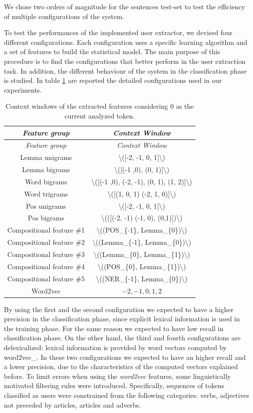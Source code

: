 \documentclass[]{book}
\theoremstyle{definition}
\theoremstyle{definition}
\theoremstyle{definition}
\theoremstyle{remark}
\begin{document}
We chose two orders of magnitude for the sentences test-set to test the
efficiency of multiple configurations of the system.

To test the performances of the implemented user extractor, we devised
four different configurations. Each configuration uses a specific
learning algorithm and a set of features to build the statistical model.
The main purpose of this procedure is to find the configurations that
better perform in the user extraction task. In addition, the different
behaviour of the system in the classification phase is studied. In table
\ref{tab:feat-confs} are reported the detailed configurations used in
our experiments.

\begin{longtable}[]{@{}cc@{}}
\caption{\label{tab:feat-confs} Context windows of the extracted features
considering 0 as the current analyzed token.}\tabularnewline
\toprule
\emph{Feature group} & \emph{Context Window}\tabularnewline
\midrule
\endfirsthead
\toprule
\emph{Feature group} & \emph{Context Window}\tabularnewline
\midrule
\endhead
Lemma unigrams & \textbackslash{}({[}-2, -1, 0,
1{]}\textbackslash{})\tabularnewline
Lemma bigrams & \textbackslash{}({[}(-1 ,0), (0,
1){]}\textbackslash{})\tabularnewline
Word bigrams & \textbackslash{}({[}(-1 ,0), (-2, -1), (0, 1), (1,
2){]}\textbackslash{})\tabularnewline
Word trigrams & \textbackslash{}({[}(1, 0, 1) (-2, 1,
0){]}\textbackslash{})\tabularnewline
Pos unigrams & \textbackslash{}({[}-2, -1, 0,
1{]}\textbackslash{})\tabularnewline
Pos bigrams & \textbackslash{}(({[}(-2, -1) (-1, 0),
(0,1){]})\textbackslash{})\tabularnewline
Compositional feature \#1 & \textbackslash{}((POS\_\{-1\},
Lemma\_\{0\})\textbackslash{})\tabularnewline
Compositional feature \#2 & \textbackslash{}((Lemma\_\{-1\},
Lemma\_\{0\})\textbackslash{})\tabularnewline
Compositional feature \#3 & \textbackslash{}((Lemma\_\{0\},
Lemma\_\{1\})\textbackslash{})\tabularnewline
Compositional feature \#4 & \textbackslash{}((POS\_\{0\},
Lemma\_\{1\})\textbackslash{})\tabularnewline
Compositional feature \#5 & \textbackslash{}((NER\_\{-1\},
Lemma\_\{0\})\textbackslash{})\tabularnewline
Word2vec & \(-2, -1, 0, 1, 2\)\tabularnewline
\bottomrule
\end{longtable}

By using the first and the second configuration we expected to have a
higher precision in the classification phase, since explicit lexical
information is used in the training phase. For the same reason we
expected to have low recall in classification phase. On the other hand,
the third and fourth configurations are delexicalized: lexical
information is provided by word vectors computed by word2vec\_. In these
two configurations we expected to have an higher recall and a lower
precision, due to the characteristics of the computed vectors explained
before. To limit errors when using the \emph{word2vec} features, some
linguistically motivated filtering rules were introduced. Specifically,
sequences of tokens classified as users were constrained from the
following categories: verbs, adjectives not preceded by articles,
articles and adverbs.
\end{document}
